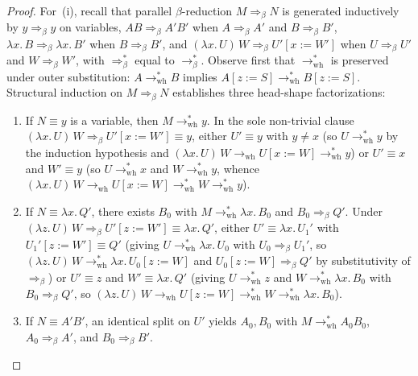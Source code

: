 \documentclass[11pt,reqno]{amsart}
\numberwithin{equation}{section}
\theoremstyle{plain}
\theoremstyle{definition}
\theoremstyle{remark}
\begin{document}
\begin{proof}
For~(i), recall that parallel $\beta$-reduction $M \Rightarrow_\beta N$ is generated inductively by $y \Rightarrow_\beta y$ on variables, $A B \Rightarrow_\beta A' B'$ when $A \Rightarrow_\beta A'$ and $B \Rightarrow_\beta B'$, $\lambda x.\, B \Rightarrow_\beta \lambda x.\, B'$ when $B \Rightarrow_\beta B'$, and $(\lambda x.\, U)\,W \Rightarrow_\beta U'[x := W']$ when $U \Rightarrow_\beta U'$ and $W \Rightarrow_\beta W'$, with $\Rightarrow_\beta^*$ equal to $\to_\beta^*$. Observe first that $\to_{\mathrm{wh}}^*$ is preserved under outer substitution: $A \to_{\mathrm{wh}}^* B$ implies $A[z := S] \to_{\mathrm{wh}}^* B[z := S]$. Structural induction on $M \Rightarrow_\beta N$ establishes three head-shape factorizations:
\begin{enumerate}[label=(\alph*),leftmargin=2.0em]
  \item If $N \equiv y$ is a variable, then $M \to_{\mathrm{wh}}^* y$. In the sole non-trivial clause $(\lambda x.\, U)\,W \Rightarrow_\beta U'[x := W'] \equiv y$, either $U' \equiv y$ with $y \ne x$ (so $U \to_{\mathrm{wh}}^* y$ by the induction hypothesis and $(\lambda x.\, U)\,W \to_{\mathrm{wh}} U[x := W] \to_{\mathrm{wh}}^* y$) or $U' \equiv x$ and $W' \equiv y$ (so $U \to_{\mathrm{wh}}^* x$ and $W \to_{\mathrm{wh}}^* y$, whence $(\lambda x.\, U)\,W \to_{\mathrm{wh}} U[x := W] \to_{\mathrm{wh}}^* W \to_{\mathrm{wh}}^* y$).
  \item If $N \equiv \lambda x.\, Q'$, there exists $B_0$ with $M \to_{\mathrm{wh}}^* \lambda x.\, B_0$ and $B_0 \Rightarrow_\beta Q'$. Under $(\lambda z.\, U)\,W \Rightarrow_\beta U'[z := W'] \equiv \lambda x.\, Q'$, either $U' \equiv \lambda x.\, U_1'$ with $U_1'[z := W'] \equiv Q'$ (giving $U \to_{\mathrm{wh}}^* \lambda x.\, U_0$ with $U_0 \Rightarrow_\beta U_1'$, so $(\lambda z.\, U)\,W \to_{\mathrm{wh}}^* \lambda x.\, U_0[z := W]$ and $U_0[z := W] \Rightarrow_\beta Q'$ by substitutivity of $\Rightarrow_\beta$) or $U' \equiv z$ and $W' \equiv \lambda x.\, Q'$ (giving $U \to_{\mathrm{wh}}^* z$ and $W \to_{\mathrm{wh}}^* \lambda x.\, B_0$ with $B_0 \Rightarrow_\beta Q'$, so $(\lambda z.\, U)\,W \to_{\mathrm{wh}} U[z := W] \to_{\mathrm{wh}}^* W \to_{\mathrm{wh}}^* \lambda x.\, B_0$).
  \item If $N \equiv A' B'$, an identical split on $U'$ yields $A_0, B_0$ with $M \to_{\mathrm{wh}}^* A_0 B_0$, $A_0 \Rightarrow_\beta A'$, and $B_0 \Rightarrow_\beta B'$.
\end{enumerate}

\end{proof}
\end{document}
